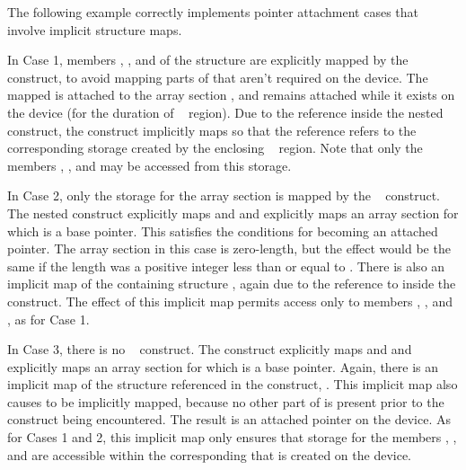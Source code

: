  


The following example correctly implements pointer attachment cases that
involve implicit structure maps.

In Case 1, members , , and  of the structure 
are explicitly mapped by the ~ construct, to avoid
mapping parts of  that aren't required on the device. The mapped
 is attached to the array section , and remains
attached while it exists on the device (for the duration of
~ region).  Due to the  reference inside the
nested  construct, the construct implicitly maps  so that
the reference refers to the corresponding storage created by the enclosing
~ region. Note that only the members ,
, and  may be accessed from this storage.

In Case 2, only the storage for the array section  is mapped
by the ~ construct.  The nested 
construct explicitly maps  and  and explicitly
maps an array section for which  is a base pointer. This satisfies
the conditions for  becoming an attached pointer. The array
section in this case is zero-length, but the effect would be the same if the
length was a positive integer less than or equal to . There is also an
implicit map of the containing structure , again due to the reference
to  inside the construct. The effect of this implicit map permits
access only to members , , and , as for Case 1. 

In Case 3, there is no ~ construct. The 
construct explicitly maps  and  and explicitly
maps an array section for which  is a base pointer. Again, there is
an implicit map of the structure referenced in the construct, . This
implicit map also causes  to be implicitly mapped, because no other
part of  is present prior to the construct being encountered. The
result is an attached pointer  on the device. As for Cases 1 and 2,
this implicit map only ensures that storage for the members , ,
and  are accessible within the corresponding  that is created
on the device.


